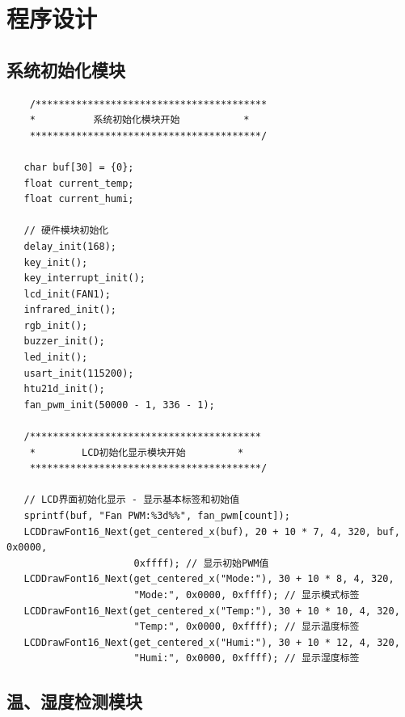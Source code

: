 \section{程序设计}

\subsection{系统初始化模块}

\begin{lstlisting}
    /****************************************
    *          系统初始化模块开始           *
    ****************************************/

   char buf[30] = {0};
   float current_temp;
   float current_humi;

   // 硬件模块初始化
   delay_init(168);
   key_init();
   key_interrupt_init();
   lcd_init(FAN1);
   infrared_init();
   rgb_init();
   buzzer_init();
   led_init();
   usart_init(115200);
   htu21d_init();
   fan_pwm_init(50000 - 1, 336 - 1);

   /****************************************
    *        LCD初始化显示模块开始         *
    ****************************************/

   // LCD界面初始化显示 - 显示基本标签和初始值
   sprintf(buf, "Fan PWM:%3d%%", fan_pwm[count]);
   LCDDrawFont16_Next(get_centered_x(buf), 20 + 10 * 7, 4, 320, buf, 0x0000,
                      0xffff); // 显示初始PWM值
   LCDDrawFont16_Next(get_centered_x("Mode:"), 30 + 10 * 8, 4, 320,
                      "Mode:", 0x0000, 0xffff); // 显示模式标签
   LCDDrawFont16_Next(get_centered_x("Temp:"), 30 + 10 * 10, 4, 320,
                      "Temp:", 0x0000, 0xffff); // 显示温度标签
   LCDDrawFont16_Next(get_centered_x("Humi:"), 30 + 10 * 12, 4, 320,
                      "Humi:", 0x0000, 0xffff); // 显示湿度标签
\end{lstlisting}

\subsection{温、湿度检测模块}

